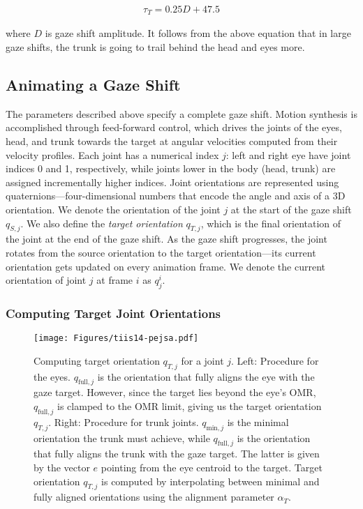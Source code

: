 \begin{eqnarray} \label{eq:TrunkLatency}
\tau_{T} = 0.25 D + 47.5
\end{eqnarray}

where $D$ is gaze shift amplitude. It follows from the above equation that in large gaze shifts, the trunk is going to trail behind the head and eyes more.

\subsection{Animating a Gaze Shift}

The parameters described above specify a complete gaze shift. Motion synthesis is accomplished through feed-forward control, which drives the joints of the eyes, head, and trunk towards the target at angular velocities computed from their velocity profiles. Each joint has a numerical index $j$: left and right eye have joint indices 0 and 1, respectively, while joints lower in the body (head, trunk) are assigned incrementally higher indices. Joint orientations are represented using quaternions---four-dimensional numbers that encode the angle and axis of a 3D orientation. We denote the orientation of the joint $j$ at the start of the gaze shift $q_{S,j}$. We also define the \emph{target orientation} $q_{T,j}$, which is the final orientation of the joint at the end of the gaze shift. As the gaze shift progresses, the joint rotates from the source orientation to the target orientation---its current orientation gets updated on every animation frame. We denote the current orientation of joint $j$ at frame $i$ as $q^i_{j}$.

\subsubsection{Computing Target Joint Orientations}
\label{sec:ModelTargetOrientations}

\begin{figure}[t]
\centering
\texttt{[image: Figures/tiis14-pejsa.pdf]}
\caption{Computing target orientation $q_{T,j}$ for a joint $j$. Left: Procedure for the eyes. $q_{\mathrm{full},j}$ is the orientation that fully aligns the eye with the gaze target. However, since the target lies beyond the eye's OMR, $q_{\mathrm{full},j}$ is clamped to the OMR limit, giving us the target orientation $q_{T,j}$. Right: Procedure for trunk joints. $q_{\mathrm{min},j}$ is the minimal orientation the trunk must achieve, while $q_{\mathrm{full},j}$ is the orientation that fully aligns the trunk with the gaze target. The latter is given by the vector $e$ pointing from the eye centroid to the target. Target orientation $q_{T,j}$ is computed by interpolating between minimal and fully aligned orientations using the alignment parameter $\alpha_T$.}
\label{fig:TargetRot}
\end{figure}

